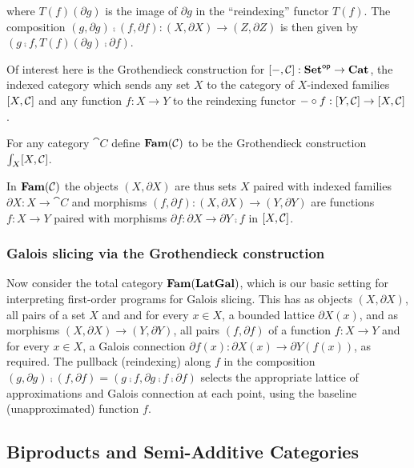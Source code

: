 \noindent where $T(f)(\partial g)$ is the image of $\partial g$ in the ``reindexing'' functor $T(f)$. The
composition $(g, \partial g) \comp (f, \partial f): (X, \partial X) \to (Z, \partial Z)$ is then given by $(g
\comp f, T(f)(\partial g) \comp \partial f)$.

Of interest here is the Grothendieck construction for $[-,\mathcal{C}]: \mathbf{Set}^{\mathsf{op}} \to \mathbf{Cat}$, the indexed
category which sends any set $X$ to the category of $X$-indexed families $[X,\mathcal{C}]$ and any function
$f: X \to Y$ to the reindexing functor $- \circ f: [Y,\mathcal{C}] \to [X,\mathcal{C}]$ .

\begin{definition}
For any category $\cat{C}$ define $\mathbf{Fam}(\mathcal{C})$ to be the Grothendieck construction
$\int_{X}[X,\mathcal{C}]$.
\end{definition}

\noindent In $\mathbf{Fam}(\mathcal{C})$ the objects $(X, \partial X)$ are thus sets $X$ paired with indexed families
$\partial X: X \to \cat{C}$ and morphisms $(f, \partial f): (X, \partial X) \to (Y, \partial Y)$ are functions
$f: X \to Y$ paired with morphisms $\partial f: \partial X \to \partial Y \comp f$ in $[X,\mathcal{C}]$.

\subsubsection{Galois slicing via the Grothendieck construction}

Now consider the total category $\mathbf{Fam}(\mathbf{LatGal})$, which is our basic setting for interpreting first-order
programs for Galois slicing. This has as objects $(X, \partial X)$, all pairs of a set $X$ and and for every
$x \in X$, a bounded lattice $\partial X(x)$, and as morphisms $(X, \partial X) \to (Y, \partial Y)$, all
pairs $(f, \partial f)$ of a function $f: X \to Y$ and for every $x \in X$, a Galois connection $\partial
f(x): \partial X(x) \to \partial Y(f(x))$, as required. The pullback (reindexing) along $f$ in the composition
$(g, \partial g) \comp (f, \partial f) = (g \comp f, \partial g \comp f \comp \partial f)$ selects the
appropriate lattice of approximations and Galois connection at each point, using the baseline (unapproximated)
function $f$.

\subsection{Biproducts and Semi-Additive Categories}

